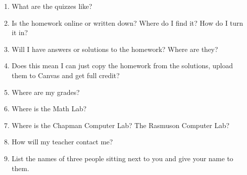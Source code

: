 \documentclass[11pt,fleqn]{article}
\begin{document}
\begin{enumerate}
\item What are the quizzes like?\\
\vfill
\newpage
\item Is the homework online or written down? Where do I find it? How do I turn it in?
\vfill
\item Will I have answers or solutions to the homework? Where are they?\\
\vfill
\item Does this mean I can just copy the homework from the solutions, upload them to Canvas and get full credit? \\
\vfill



\item Where are my grades?\\
\vfill

\item Where is the Math Lab?\\
\vfill

\item Where is the Chapman Computer Lab? The Rasmuson Computer Lab?\\
\vfill

\item How will my teacher contact me? \\
\vfill
\item List the names of three people sitting next to you and give your name to them.
\vfill
\end{enumerate}
\end{document}
